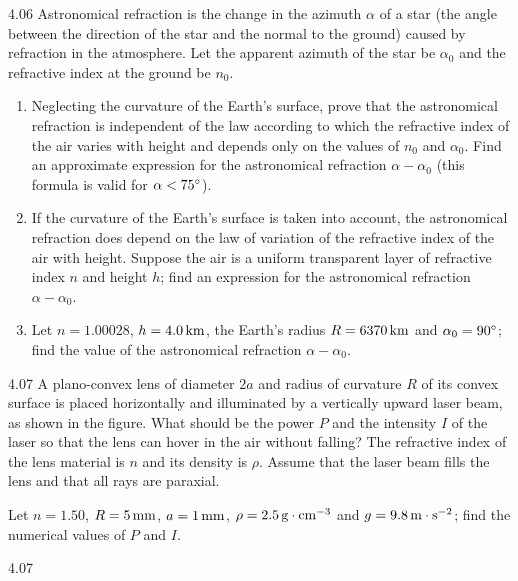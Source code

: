 \begin{problem}{4.06}
Astronomical refraction is the change in the azimuth $\alpha$ of a star (the angle between the direction of the star and the normal to the ground) caused by refraction in the atmosphere. Let the apparent azimuth of the star be $\alpha_0$ and the refractive index at the ground be $n_0$.
\begin{enumerate}[label=(\arabic*),leftmargin=2.2em,itemsep=2pt,topsep=2pt]
\item Neglecting the curvature of the Earth's surface, prove that the astronomical refraction is independent of the law according to which the refractive index of the air varies with height and depends only on the values of $n_0$ and $\alpha_0$. Find an approximate expression for the astronomical refraction $\alpha-\alpha_0$ (this formula is valid for $\alpha<75^{\circ}$).
\item If the curvature of the Earth's surface is taken into account, the astronomical refraction does depend on the law of variation of the refractive index of the air with height. Suppose the air is a uniform transparent layer of refractive index $n$ and height $h$; find an expression for the astronomical refraction $\alpha-\alpha_0$.
\item Let $n = 1.00028$, $h = 4.0\,\mathrm{km}$, the Earth's radius $R = 6370\,\mathrm{km}$ and $\alpha_0 = 90^{\circ}$; find the value of the astronomical refraction $\alpha-\alpha_0$.
\end{enumerate}
\end{problem}

\begin{problem}{4.07}
A plano-convex lens of diameter $2a$ and radius of curvature $R$ of its convex surface is placed horizontally and illuminated by a vertically upward laser beam, as shown in the figure. What should be the power $P$ and the intensity $I$ of the laser so that the lens can hover in the air without falling? The refractive index of the lens material is $n$ and its density is $\rho$. Assume that the laser beam fills the lens and that all rays are paraxial.

Let $n = 1.50$, $R = 5\,\mathrm{mm}$, $a = 1\,\mathrm{mm}$, $\rho = 2.5\,\mathrm{g\cdot cm^{-3}}$ and $g = 9.8\,\mathrm{m\cdot s^{-2}}$; find the numerical values of $P$ and $I$.
\end{problem}

\begin{figbox}{4.07}
\end{figbox}

